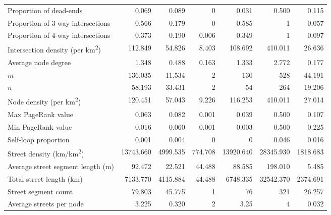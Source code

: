 \begin{table*}[htbp]
\begin{tabular}{ l r r r r r r }
		Proportion of dead-ends                          & 0.069          & 0.089          & 0          & 0.031          & 0.500          & 0.115          \\
		Proportion of 3-way intersections                & 0.566          & 0.179          & 0          & 0.585          & 1          & 0.057          \\
		Proportion of 4-way intersections                & 0.373          & 0.190          & 0.006          & 0.349          & 1          & 0.097          \\
		Intersection density (per km\textsuperscript{2}) & 112.849         & 54.826          & 8.403         & 108.692         & 410.011         & 26.636          \\
		Average node degree                              & 1.348          & 0.488          & 0.163          & 1.333          & 2.772          & 0.177          \\
		$m$                                              & 136.035          & 11.534          & 2           & 130          & 528         & 44.191     \\
		$n$                                              & 58.193          & 33.431          & 2            & 54           & 264         & 19.206      \\
		Node density (per km\textsuperscript{2})         & 120.451         & 57.043          & 9.226         & 116.253         & 410.011         & 27.014          \\
		Max PageRank value                               & 0.063          & 0.082          & 0.001 & 0.039          & 0.500          & 0.107 \\
		Min PageRank value                               & 0.016 & 0.060 & 0.001 & 0.003 & 0.500 & 0.225 \\
		Self-loop proportion                             & 0.001          & 0.004          & 0 & 0          & 0.046          & 0.016         \\
		Street density (km/km\textsuperscript{2})        & 13743.660          & 4999.535          & 774.708          & 13920.640          & 28345.930         & 1818.683          \\
		Average street segment length (m)                & 92.472        & 22.521         & 44.488        & 88.585        & 198.010        & 5.485          \\
		Total street length (km)                         & 7133.770           & 4115.884           & 44.488            & 6748.335           & 32542.370          & 2374.691      \\
		Street segment count                             & 79.803          & 45.775          & 1           & 76           & 321         & 26.257      \\
		Average streets per node                         & 3.225          & 0.320          & 2          & 3.25          & 4          & 0.032          \\
		\bottomrule
	\end{tabular}
\end{table*}


